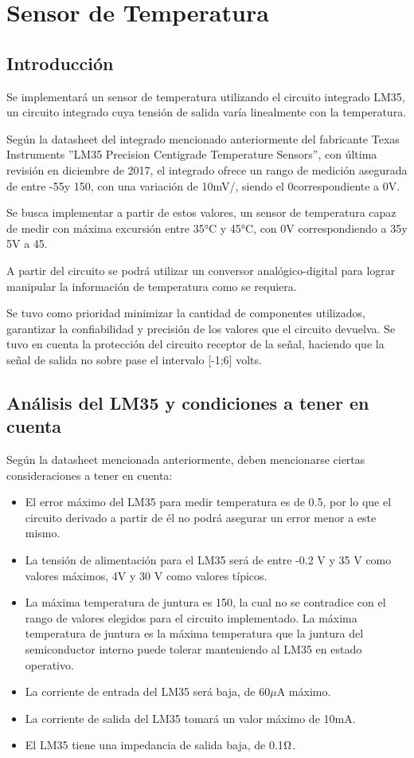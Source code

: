 \documentclass[../../main.tex]{subfiles}
\begin{document}
\section{Sensor de Temperatura}

\subsection{Introducción}

Se implementará un sensor de temperatura utilizando el circuito integrado LM35, un circuito integrado cuya tensión de salida varía linealmente con la temperatura. \par
Según la datasheet del integrado mencionado anteriormente del fabricante Texas Instruments ''LM35 Precision Centigrade Temperature Sensors'', con última revisión en diciembre de 2017, el integrado ofrece un rango de medición asegurada de entre -55\celsius y 150\celsius, con una variación de 10mV/\celsius, siendo el 0\celsius correspondiente a 0V. \par
Se busca implementar a partir de estos valores, un sensor de temperatura capaz de medir con máxima excursión entre 35°C y 45°C, con 0V correspondiendo a 35\celsius y 5V a 45\celsius.\par
A partir del circuito se podrá utilizar un conversor analógico-digital para lograr manipular la información de temperatura como se requiera. \par
Se tuvo como prioridad minimizar la cantidad de componentes utilizados, garantizar la confiabilidad y precisión de los valores que el circuito devuelva. Se tuvo en cuenta la protección del circuito receptor de la señal, haciendo que la señal de salida no sobre pase el intervalo [-1;6] volts.

\subsection{Análisis del LM35 y condiciones a tener en cuenta}

Según la datasheet mencionada anteriormente, deben mencionarse ciertas consideraciones a tener en cuenta: 
\begin{itemize}
\item El error máximo del LM35 para medir temperatura es de 0.5\celsius, por lo que el circuito derivado a partir de él no podrá asegurar un error menor a este mismo.
\item La tensión de alimentación para el LM35 será de entre -0.2 V y 35 V como valores máximos, 4V  y 30 V como valores típicos.
\item La máxima temperatura de juntura es 150\celsius, la cual no se contradice con el rango de valores elegidos para el circuito implementado. La máxima temperatura de juntura es la máxima temperatura que la juntura del semiconductor interno puede tolerar manteniendo al LM35 en estado operativo.
\item La corriente de entrada del LM35 será baja, de 60$\mu$A máximo.
\item La corriente de salida del LM35 tomará un valor máximo de 10mA.
\item El LM35 tiene una impedancia de salida baja, de 0.1$\ohm$.
\end{itemize}
\end{document}
